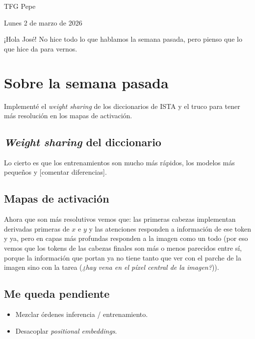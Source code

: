 \documentclass[a4paper,12pt]{article}
\begin{document}
{\centering \textsf{TFG Pepe}\par}

\vspace{0.5in}

{\huge Lunes 2 de marzo de 2026}

\vspace{0.5in}

¡Hola José! No hice todo lo que hablamos la semana pasada, pero pienso que lo que hice da para vernos.

\tableofcontents

\section{Sobre la semana pasada}

Implementé el \emph{weight sharing} de los diccionarios de ISTA y el truco para tener más resolución en los mapas de activación.

\subsection{\emph{Weight sharing} del diccionario}

Lo cierto es que los entrenamientos son mucho más rápidos, los modelos más pequeños y [comentar diferencias].



\subsection{Mapas de activación}

Ahora que son más resolutivos vemos que: las primeras cabezas implementan derivadas primeras de $x$ e $y$ y las atenciones responden a información de ese token y ya, pero en capas más profundas responden a la imagen como un todo (por eso vemos que los tokens de las cabezas finales son más o menos parecidos entre sí, porque la información que portan ya no tiene tanto que ver con el parche de la imagen sino con la tarea (\emph{¿hay vena en el píxel central de la imagen?})).


\subsection{Me queda pendiente}

\begin{itemize}
    \item Mezclar órdenes inferencia / entrenamiento.
    \item Desacoplar \emph{positional embeddings}.
\end{itemize}
\end{document}
